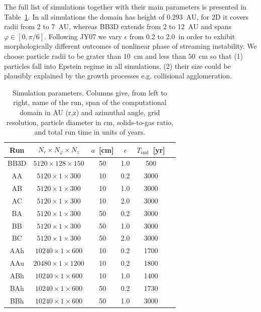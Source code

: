 The full list of simulations together with their main parameters is presented in
Table~\ref{tab1}. In all simulations the domain has height of $0.293$~AU,
for 2D it covers radii from 2 to 7~AU, whereas BB3D extends from 2 to 12~AU and
spans $\varphi\in[0, \pi/6]$.  Following JY07 we vary $\epsilon$ from 0.2 to
2.0~in order to exhibit morphologically different outcomes of nonlinear phase of
streaming instability.  We choose particle radii to be grater than $10$~cm and
less than $50$~cm so that (1) particles fall into Epstein regime in all
simulations, (2) their size could be plausibly explained by the growth processes
e.g. collisional agglomeration.

\begin{table}
   \centering
   \begin{tabular}{cccccc}
      \hline
      Run & $N_r \times N_\varphi \times N_z$ &
      $a$~[cm] & $\epsilon$ & $T_\textrm{end}$~[yr] \\
      \hline
      BB3D &  $5120  \times 128 \times 150$  & 50  & 1.0 & 500  \\
      AA   &  $5120  \times 1   \times 300$  & 10  & 0.2 & 3000 \\
      AB   &  $5120  \times 1   \times 300$  & 10  & 1.0 & 3000 \\
      AC   &  $5120  \times 1   \times 300$  & 10  & 2.0 & 3000 \\
      BA   &  $5120  \times 1   \times 300$  & 50  & 0.2 & 3000 \\
      BB   &  $5120  \times 1   \times 300$  & 50  & 1.0 & 3000 \\
      BC   &  $5120  \times 1   \times 300$  & 50  & 2.0 & 3000 \\
      AAh  &  $10240 \times 1   \times 600$  & 10  & 0.2 & 1700 \\
      AAu  &  $20480 \times 1   \times 1200$ & 10  & 0.2 & 1800 \\
      ABh  &  $10240 \times 1   \times 600$  & 10  & 1.0 & 1400 \\
      BAh  &  $10240 \times 1   \times 600$  & 50  & 0.2 & 1730 \\
      BBh  &  $10240 \times 1   \times 600$  & 50  & 1.0 & 3000 \\
      \hline
   \end{tabular}
\caption{Simulation parameters. Columns give, from left to right, name of the
   run, span of the computational domain in AU (r,z) and azimuthal angle, grid
   resolution, particle diameter in cm, solids-to-gas ratio, and total run time
   in units of years.} 
\label{tab1}
\end{table}

